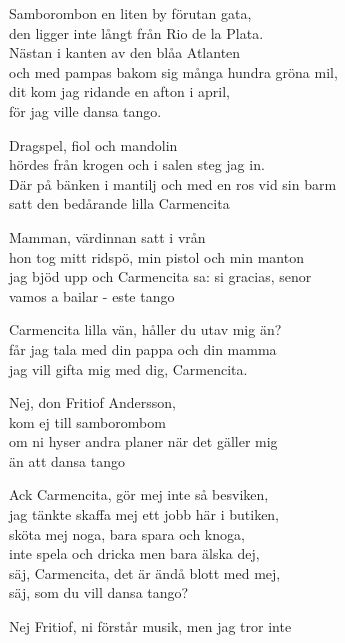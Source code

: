 \vspace{10pt}
Samborombon en liten by förutan gata,\\
den ligger inte långt från Rio de la Plata.\\
Nästan i kanten av den blåa Atlanten\\
och med pampas bakom sig många hundra gröna mil,\\
dit kom jag ridande en afton i april,\\
för jag ville dansa tango.\par
\vspace{10pt}
Dragspel, fiol och mandolin\\
hördes från krogen och i salen steg jag in.\\
Där på bänken i mantilj och med en ros vid sin barm\\
satt den bedårande lilla Carmencita\par
\vspace{10pt}
Mamman, värdinnan satt i vrån\\
hon tog mitt ridspö, min pistol och min manton\\
jag bjöd upp och Carmencita sa: si gracias, senor\\
vamos a bailar - este tango\par
\vspace{10pt}
Carmencita lilla vän, håller du utav mig än?\\
får jag tala med din pappa och din mamma\\
jag vill gifta mig med dig, Carmencita.\par
\vspace{10pt}
Nej, don Fritiof Andersson,\\
kom ej till samborombom\\
om ni hyser andra planer när det gäller mig\\
än att dansa tango\par
\newpage
Ack Carmencita, gör mej inte så besviken,\\
jag tänkte skaffa mej ett jobb här i butiken,\\
sköta mej noga, bara spara och knoga,\\
inte spela och dricka men bara älska dej,\\
säj, Carmencita, det är ändå blott med mej,\\
säj, som du vill dansa tango?\par
\vspace{10pt}
Nej Fritiof, ni förstår musik, men jag tror inte\\
